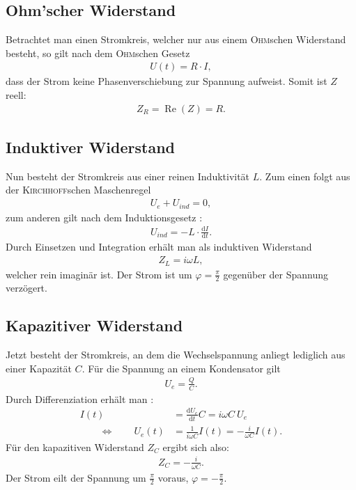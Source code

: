 \documentclass[12pt,a4paper,titlepage,headinclude]{scrartcl}
\numberwithin{equation}{section}
\renewcommand{\d}{\ensuremath{\mathrm{d}}} %
\newcommand{\aeqiv}{\ensuremath{\qquad \Longleftrightarrow \qquad}} %
\newcommand{\person}[1]{\textsc{#1}}
\begin{document}
\subsection{Ohm'scher Widerstand}
Betrachtet man einen Stromkreis, welcher nur aus einem \person{Ohm}schen Widerstand besteht, so gilt nach dem \person{Ohm}schen Gesetz
\begin{align}
	U(t)=R\cdot I,
	\label{eq:ohm}
\end{align}
dass der Strom keine Phasenverschiebung zur Spannung aufweist. Somit ist $Z$ reell:
\begin{align}
	Z_{R}=\operatorname{Re}(Z)=R.
	\label{eq:zR}
\end{align}
\subsection{Induktiver Widerstand}
Nun besteht der Stromkreis aus einer reinen Induktivität $L$. Zum einen folgt aus der \person{Kirchhoff}schen Maschenregel \cite[55]{demtroeder2}
\begin{align}
	U_e+U_{ind}=0,
	\label{eq:indmasche}
\end{align}
zum anderen gilt nach dem Induktionsgesetz \cite[131]{demtroeder2}:
\begin{align}
	U_{ind}=-L\cdot\frac{\d I}{\d t}.
	\label{eq:uind}
\end{align}
Durch Einsetzen und Integration erhält man als induktiven Widerstand \cite[256]{nol3}
\begin{align}
	Z_{L}=i\omega L,
	\label{eq:zL}
\end{align}
welcher rein imaginär ist. Der Strom ist um $\varphi=\frac{\pi}{2}$ gegenüber der Spannung verzögert.
\subsection{Kapazitiver Widerstand}
Jetzt besteht der Stromkreis, an dem die Wechselspannung anliegt lediglich aus einer Kapazität $C$. Für die Spannung an einem Kondensator gilt \cite[152]{demtroeder2}
\begin{align}
	U_e=\frac{Q}{C}.
	\label{eq:kond}
\end{align}
Durch Differenziation erhält man \cite[257]{nol3}:
\begin{align}
	I(t)&=\frac{\d U_e}{\d t}C=i\omega C~ U_e\\
	\aeqiv U_e(t)&=\frac{1}{i\omega C}I(t)=-\frac{i}{\omega C}I(t).
	\label{eq:herleitungzC}
\end{align}
Für den kapazitiven Widerstand $Z_C$ ergibt sich also:
\begin{align}
	Z_C=-\frac{i}{\omega C}.
	\label{eq:zC}
\end{align}
Der Strom eilt der Spannung um $\frac{\pi}{2}$ voraus, $\varphi=-\frac{\pi}{2}$.
\end{document}
